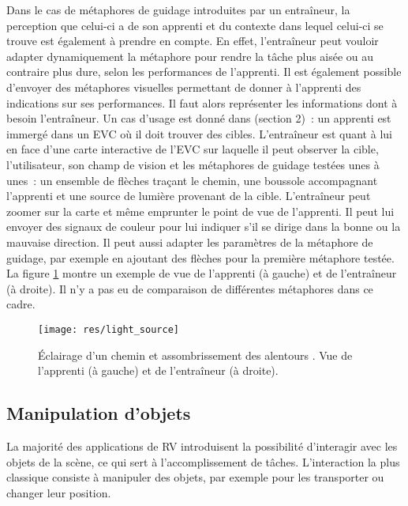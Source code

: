 \documentclass[11pt]{article}
\begin{document}
Dans le cas de métaphores de guidage introduites par un entraîneur, la perception que celui-ci a de son apprenti et du contexte dans lequel celui-ci se trouve est également à prendre en compte. En effet, l'entraîneur peut vouloir adapter dynamiquement la métaphore pour rendre la tâche plus aisée ou au contraire plus dure, selon les performances de l'apprenti. Il est également possible d'envoyer des métaphores visuelles permettant de donner à l'apprenti des indications sur ses performances. Il faut alors représenter les informations dont à besoin l'entraîneur. Un cas d'usage est donné dans \cite{thesis} (section 2)~: un apprenti est immergé dans un EVC où il doit trouver des cibles. L'entraîneur est quant à lui en face d'une carte interactive de l'EVC sur laquelle il peut observer la cible, l'utilisateur, son champ de vision et les métaphores de guidage testées unes à unes~: un ensemble de flèches traçant le chemin, une boussole accompagnant l'apprenti et une source de lumière provenant de la cible. L'entraîneur peut zoomer sur la carte et même emprunter le point de vue de l'apprenti. Il peut lui envoyer des signaux de couleur pour lui indiquer s'il se dirige dans la bonne ou la mauvaise direction. Il peut aussi adapter les paramètres de la métaphore de guidage, par exemple en ajoutant des flèches pour la première métaphore testée. La figure \ref{fig:light-source} montre un exemple de vue de l'apprenti (à gauche) et de l'entraîneur (à droite). Il n'y a pas eu de comparaison de différentes métaphores dans ce cadre.

\begin{figure}
\centering
\texttt{[image: res/light\_source]}
\caption{\label{fig:light-source}Éclairage d'un chemin et assombrissement des alentours \cite{thesis}. Vue de l'apprenti (à gauche) et de l'entraîneur (à droite).}
\end{figure}

\subsection{Manipulation d'objets}
\label{subsec:manipulation}
La majorité des applications de RV introduisent la possibilité d'interagir avec les objets de la scène, ce qui sert à l'accomplissement de t\^aches. L'interaction la plus classique consiste à manipuler des objets, par exemple pour les transporter ou changer leur position.
\\
\end{document}
